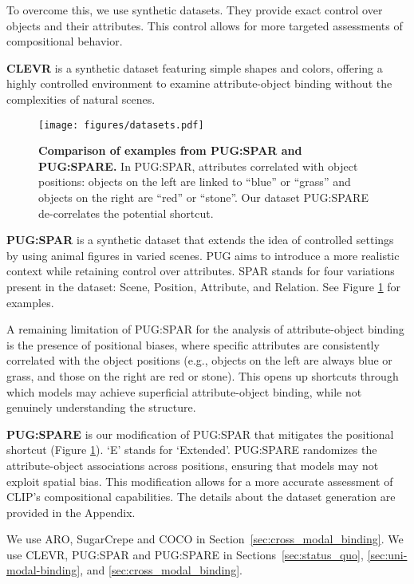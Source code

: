 To overcome this, we use synthetic datasets. They provide exact control over objects and their attributes. This control allows for more targeted assessments of compositional behavior.

\textbf{CLEVR} \cite{Johnson2017} is a synthetic dataset featuring simple shapes and colors, offering a highly controlled environment to examine attribute-object binding without the complexities of natural scenes.

\begin{figure}[t]
  \centering
   \texttt{[image: figures/datasets.pdf]}
   \caption{\textbf{Comparison of examples from PUG:SPAR \cite{Bordes2024} and PUG:SPARE.} In PUG:SPAR, attributes correlated with object positions: objects on the left are linked to ``blue'' or ``grass'' and objects on the right are ``red'' or ``stone''. Our dataset PUG:SPARE de-correlates the potential shortcut.}
   \label{fig:pug}
\end{figure}

\textbf{PUG:SPAR} \cite{Bordes2024} is a synthetic dataset that extends the idea of controlled settings by using animal figures in varied scenes. PUG
aims to introduce a more realistic context while retaining control over attributes. SPAR stands for four variations present in the dataset: Scene, Position, Attribute, and Relation. See Figure \ref{fig:pug} for examples.


A remaining limitation of PUG:SPAR for the analysis of attribute-object binding is the presence of positional biases, where specific attributes are consistently correlated with the object positions (e.g., objects on the left are always blue or grass, and those on the right are red or stone). This opens up shortcuts through which models may achieve superficial attribute-object binding, while not genuinely understanding the structure.

\textbf{PUG:SPARE} is our modification of PUG:SPAR that mitigates the positional shortcut (Figure \ref{fig:pug}). `E' stands for `Extended'. PUG:SPARE randomizes the attribute-object associations across positions, ensuring that models may not exploit spatial bias. This modification allows for a more accurate assessment of CLIP’s compositional capabilities. The details about the dataset generation are provided in the Appendix. 

We use ARO, SugarCrepe and COCO in Section~\ref{sec:cross_modal_binding}. We use CLEVR, PUG:SPAR and PUG:SPARE in Sections~\ref{sec:status_quo}, \ref{sec:uni-modal-binding}, and \ref{sec:cross_modal_binding}.














